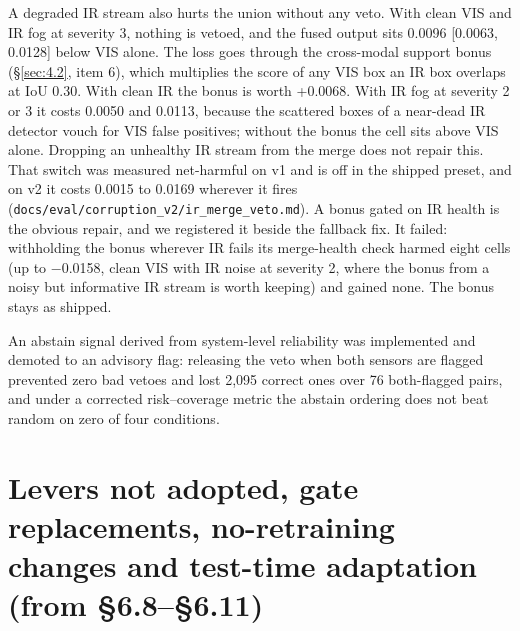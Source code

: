 \documentclass[10pt]{article}
\begin{document}
A degraded IR stream also hurts the union without any veto. With clean VIS and IR fog at severity 3, nothing is vetoed, and the fused output sits 0.0096 [0.0063, 0.0128] below VIS alone. The loss goes through the cross-modal support bonus (\S\ref{sec:4.2}, item 6), which multiplies the score of any VIS box an IR box overlaps at IoU 0.30. With clean IR the bonus is worth +0.0068. With IR fog at severity 2 or 3 it costs 0.0050 and 0.0113, because the scattered boxes of a near-dead IR detector vouch for VIS false positives; without the bonus the cell sits above VIS alone. Dropping an unhealthy IR stream from the merge does not repair this. That switch was measured net-harmful on v1 and is off in the shipped preset, and on v2 it costs 0.0015 to 0.0169 wherever it fires (\texttt{docs/\allowbreak{}eval/\allowbreak{}corruption\_\allowbreak{}v2/\allowbreak{}ir\_\allowbreak{}merge\_\allowbreak{}veto.md}). A bonus gated on IR health is the obvious repair, and we registered it beside the fallback fix. It failed: withholding the bonus wherever IR fails its merge-health check harmed eight cells (up to $-$0.0158, clean VIS with IR noise at severity 2, where the bonus from a noisy but informative IR stream is worth keeping) and gained none. The bonus stays as shipped.

An abstain signal derived from system-level reliability was implemented and demoted to an advisory flag: releasing the veto when both sensors are flagged prevented zero bad vetoes and lost 2,095 correct ones over 76 both-flagged pairs, and under a corrected risk--coverage metric the abstain ordering does not beat random on zero of four conditions.

\FloatBarrier
\section{Levers not adopted, gate replacements, no-retraining changes and test-time adaptation (from \S6.8--\S6.11)}\label{app:J}
\end{document}
